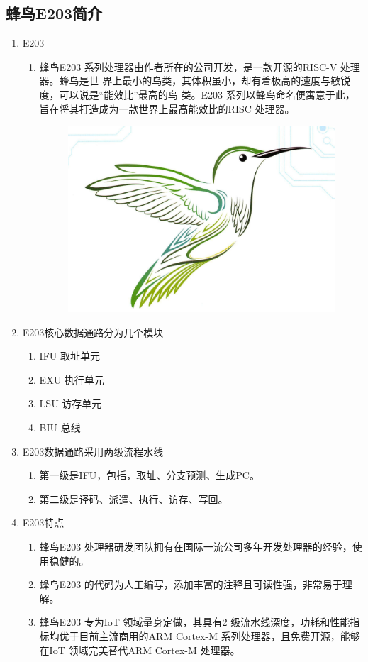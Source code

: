 \documentclass[a4paper, 14pt, oneside]{book} %
\numberwithin{equation}{subsection}
\begin{document}
\begin{enumerate}
		\subsection{蜂鸟E203简介}
		\begin{enumerate}
			\item{E203}
			\begin{enumerate}
				\item 蜂鸟E203 系列处理器由作者所在的公司开发，是一款开源的RISC-V 处理器。蜂鸟是世
				界上最小的鸟类，其体积虽小，却有着极高的速度与敏锐度，可以说是“能效比”最高的鸟
				类。E203 系列以蜂鸟命名便寓意于此，旨在将其打造成为一款世界上最高能效比的RISC 处理器。
				\begin{figure}[!htbp]
					\centering
					\includegraphics[scale=0.8]{img/four.png}
				\end{figure}
			\end{enumerate}	
			\item{E203核心数据通路分为几个模块}
			\begin{enumerate}
				\item IFU 取址单元
				\item EXU 执行单元
				\item LSU 访存单元
				\item BIU 总线
			\end{enumerate}	
			\item{E203数据通路采用两级流程水线}
			\begin{enumerate}
				\item 第一级是IFU，包括，取址、分支预测、生成PC。
				\item 第二级是译码、派遣、执行、访存、写回。
			\end{enumerate}	
			\item{E203特点}
			\begin{enumerate}
				\item 蜂鸟E203 处理器研发团队拥有在国际一流公司多年开发处理器的经验，使用稳健的。
				\item 蜂鸟E203 的代码为人工编写，添加丰富的注释且可读性强，非常易于理解。
				\item 蜂鸟E203 专为IoT 领域量身定做，其具有2 级流水线深度，功耗和性能指标均优于目前主流商用的ARM Cortex-M 系列处理器，且免费开源，能够在IoT 领域完美替代ARM Cortex-M 处理器。
			\end{enumerate}	
		\end{enumerate}	

\end{enumerate}
\end{document}
